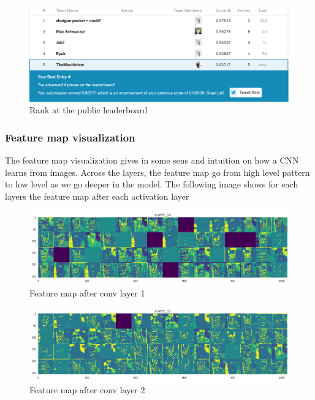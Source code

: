 \documentclass[a4paper]{article}
\begin{document}
\begin{figure}[h!]
	\centering
	\includegraphics[scale=.4]{kaggle.png}
	\caption{Rank at the public leaderboard}
	\label{fig:kaggle}
\end{figure}

\subsubsection{Feature map visualization}
The feature map visualization gives in some sens and intuition on how a CNN learns from images. Across the layers, the feature map go from high level pattern to low level as we go deeper in the model. The following image shows for each layers the feature map after each activation layer

\begin{figure}[h!]
	\centering
	\includegraphics[scale=.3]{fp1.png}
	\caption{Feature map after conv layer 1}
	\label{fig:fp1}
\end{figure}

\begin{figure}[h!]
	\centering
	\includegraphics[scale=.3]{fp2.png}
	\caption{Feature map after conv layer 2}
	\label{fig:fp2}
\end{figure}
\end{document}
